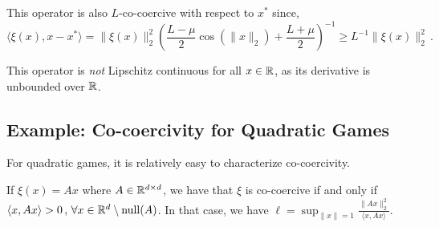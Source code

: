 \documentclass{article}
\DeclareMathOperator{\nulls}{null}
\begin{document}
This operator is also $L$-co-coercive with respect to $x^*$ since, 
\begin{equation}
  \langle \xi(x) , x-x^*\rangle = \|\xi(x)\|_2^2 (\frac{L-\mu}{2} \cos(\|x\|_2) + \frac{L+\mu}{2})^{-1} \geq L^{-1} \|\xi(x)\|_2^2  \, .
\end{equation}

This operator is \emph{not} Lipschitz continuous for all $x \in \mathbb{R}$, as its derivative is unbounded over $\mathbb{R}$.

\subsection{Example: Co-coercivity for Quadratic Games}
For quadratic games, it is relatively easy to characterize co-coercivity. 
\begin{proposition}
	If $\xi(x) = Ax$ where $A \in \mathbb{R}^{d\times d}$, we have that $\xi$ is co-coercive if and only if $\langle x,Ax\rangle > 0\,,\,\forall x\in\R^d \setminus \nulls(A)$. In that case, we have $\ell = \sup_{\|x\|= 1} \frac{\|A x\|_2^2}{ \langle x,Ax\rangle}$.
\end{proposition}
\end{document}
